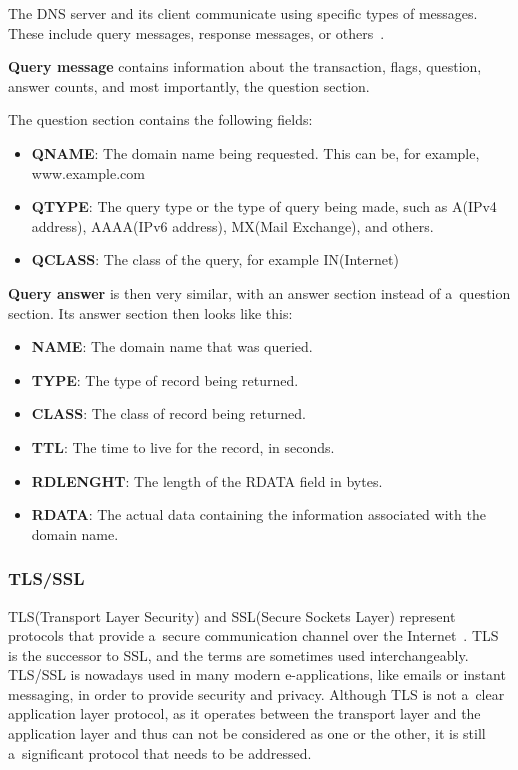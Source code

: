 \documentclass[
  printed,     %
  color,       %
  oneside,     %
  nosansbold,  %
  nocolorbold, %
  nolof,         %
  nolot,         %
]{fithesis4}
\begin{document}
The DNS server and its client communicate using specific types of messages. These include query messages, response messages, or others~\cite{10.5555/2584507}.

\textbf{Query message} contains information about the transaction, flags, question, answer counts, and most importantly, the question section.

The question section contains the following fields:

\begin{itemize}[noitemsep,topsep=0pt]
    \item \textbf{QNAME}: The domain name being requested. This can be, for example, www.example.com
    \item \textbf{QTYPE}: The query type or the type of query being made, such as A(IPv4 address), AAAA(IPv6 address), MX(Mail Exchange), and others.
    \item \textbf{QCLASS}: The class of the query, for example IN(Internet)
\end{itemize}

\textbf{Query answer} is then very similar, with an answer section instead of a~question section. Its answer section then looks like this:

\begin{itemize}[noitemsep,topsep=0pt]
    \item \textbf{NAME}: The domain name that was queried.
    \item \textbf{TYPE}: The type of record being returned.
    \item \textbf{CLASS}: The class of record being returned.
    \item \textbf{TTL}: The time to live for the record, in seconds.
    \item \textbf{RDLENGHT}: The length of the RDATA field in bytes.
    \item \textbf{RDATA}: The actual data containing the information associated with the domain name.
\end{itemize}

\subsubsection{TLS/SSL}

TLS(Transport Layer Security) and SSL(Secure Sockets Layer) represent protocols that provide a~secure communication channel over the Internet~\cite{SSLTLSin60:online}. TLS is the successor to SSL, and the terms are sometimes used interchangeably. TLS/SSL is nowadays used in many modern e-applications, like emails or instant messaging, in order to provide security and privacy. Although TLS is not a~clear application layer protocol, as it operates between the transport layer and the application layer and thus can not be considered as one or the other, it is still a~significant protocol that needs to be addressed.
\end{document}
